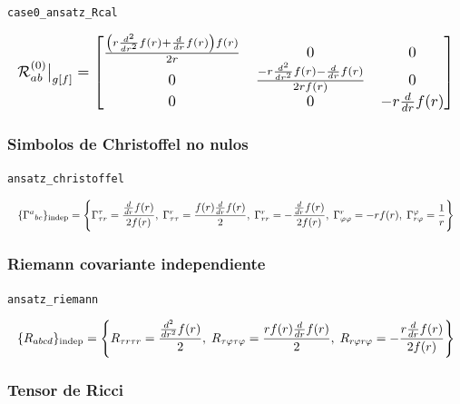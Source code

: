 \documentclass[11pt,a4paper]{article}
\begin{document}
\noindent\texttt{case0\_ansatz\_Rcal}\par\nopagebreak[4]

\[
\resizebox{\textwidth}{!}{$\displaystyle \mathcal R^{(0)}_{ab}\big|_{g[f]} = \left[\begin{matrix}\frac{\left(r \frac{d^{2}}{d r^{2}} f{\left(r \right)} + \frac{d}{d r} f{\left(r \right)}\right) f{\left(r \right)}}{2 r} & 0 & 0\\0 & \frac{- r \frac{d^{2}}{d r^{2}} f{\left(r \right)} - \frac{d}{d r} f{\left(r \right)}}{2 r f{\left(r \right)}} & 0\\0 & 0 & - r \frac{d}{d r} f{\left(r \right)}\end{matrix}\right]$}
\]

\subsubsection{Simbolos de Christoffel no nulos}

\noindent\texttt{ansatz\_christoffel}\par\nopagebreak[4]

\[
\resizebox{\textwidth}{!}{$\displaystyle \{\Gamma^a{}_{bc}\}_{\mathrm{indep}} = \left\{\Gamma^{\tau}_{{\tau}{r}}=\frac{\frac{d}{d r} f{\left(r \right)}}{2 f{\left(r \right)}},\;\Gamma^{r}_{{\tau}{\tau}}=\frac{f{\left(r \right)} \frac{d}{d r} f{\left(r \right)}}{2},\;\Gamma^{r}_{{r}{r}}=- \frac{\frac{d}{d r} f{\left(r \right)}}{2 f{\left(r \right)}},\;\Gamma^{r}_{{\varphi}{\varphi}}=- r f{\left(r \right)},\;\Gamma^{\varphi}_{{r}{\varphi}}=\frac{1}{r}\right\}$}
\]

\subsubsection{Riemann covariante independiente}

\noindent\texttt{ansatz\_riemann}\par\nopagebreak[4]

\[
\resizebox{\textwidth}{!}{$\displaystyle \{R_{abcd}\}_{\mathrm{indep}} = \left\{R_{{\tau}{r}{\tau}{r}}=\frac{\frac{d^{2}}{d r^{2}} f{\left(r \right)}}{2},\;R_{{\tau}{\varphi}{\tau}{\varphi}}=\frac{r f{\left(r \right)} \frac{d}{d r} f{\left(r \right)}}{2},\;R_{{r}{\varphi}{r}{\varphi}}=- \frac{r \frac{d}{d r} f{\left(r \right)}}{2 f{\left(r \right)}}\right\}$}
\]

\subsubsection{Tensor de Ricci}
\end{document}
